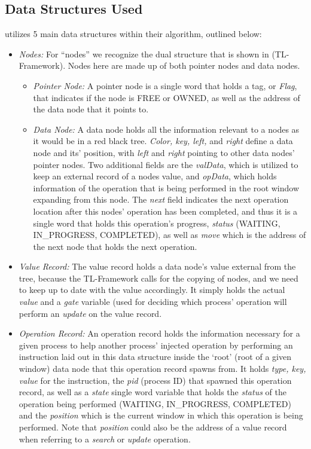 \documentclass[letterpaper, 10 pt, conference]{ieeeconf}
\begin{document}
	\subsection{Data Structures Used}
	\cite{c1} utilizes 5 main data structures within their algorithm, outlined below:
	\begin{itemize}
		\item \textit{Nodes:} For ``nodes'' we recognize the dual structure that is shown in \cite{c5} (TL-Framework). Nodes here are made up of both pointer nodes and data nodes.
		\begin{itemize}
			\item \textit{Pointer Node:} A pointer node is a single word that holds a tag, or \textit{Flag}, that indicates if the node is FREE or OWNED, as well as the address of the data node that it points to.
			\item \textit{Data Node:} A data node holds all the information relevant to a nodes as it would be in a red black tree. \textit{Color, key, left,} and \textit{right} define a data node and its' position, with \textit{left} and \textit{right} pointing to other data nodes' pointer nodes. Two additional fields are the \textit{valData}, which is utilized to keep an external record of a nodes value, and \textit{opData}, which holds information of the operation that is being performed in the root window expanding from this node. The \textit{next} field indicates the next operation location after this nodes' operation has been completed, and thus it is a single word that holds this operation's progress, \textit{status} (WAITING, IN\_PROGRESS, COMPLETED), as well as \textit{move} which is the address of the next node that holds the next operation.
		\end{itemize}
	\item \textit{Value Record:} The value record holds a data node's value external from the tree, because the TL-Framework calls for the copying of nodes, and we need to keep up to date with the value accordingly. It simply holds the actual \textit{value} and a \textit{gate} variable (used for deciding which process' operation will perform an \textit{update} on the value record.
	\item \textit{Operation Record:} An operation record holds the information necessary for a given process to help another process' injected operation by performing an instruction laid out in this data structure inside the `root' (root of a given window) data node that this operation record spawns from. It holds \textit{type, key, value} for the instruction, the \textit{pid} (process ID) that spawned this operation record, as well as a \textit{state} single word variable that holds the \textit{status} of the operation being performed (WAITING, IN\_PROGRESS, COMPLETED) and the \textit{position} which is the current window in which this operation is being performed. Note that \textit{position} could also be the address of a value record when referring to a \textit{search} or \textit{update} operation.

\end{itemize}
\end{document}
